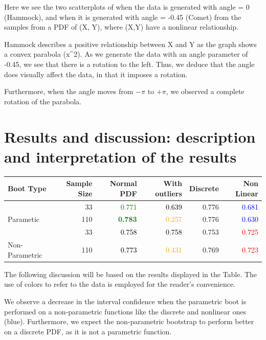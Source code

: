 \documentclass[11pt,]{article}
\begin{document}
Here we see the two scatterplots of when the data is generated with
angle = 0 (Hammock), and when it is generated with angle = -0.45 (Comet)
from the samples from a PDF of (X, Y), where (X,Y) have a nonlinear
relationship.

Hammock describes a positive relationship between X and Y as the graph
shows a convex parabola (x\^{}2). As we generate the data with an angle
parameter of -0.45, we see that there is a rotation to the left. Thus,
we deduce that the angle does visually affect the data, in that it
imposes a rotation.

Furthermore, when the angle moves from \(-\pi\) to \(+\pi\), we observed
a complete rotation of the parabola.

\hypertarget{results-and-discussion-description-and-interpretation-of-the-results}{%
\section{Results and discussion: description and interpretation of the
results}\label{results-and-discussion-description-and-interpretation-of-the-results}}

\begin{table}
\centering
\begin{tabular}{l|r|>{}r|>{}r|r|>{}r}
\hline
Boot Type & Sample Size & Normal PDF & With outliers & Discrete & Non Linear\\
\hline
 & 33 & \textcolor{green}{0.771} & \textcolor{black}{0.639} & 0.776 & \textcolor{blue}{0.681}\\
\cline{2-6}
\multirow[t]{-2}{*}{\raggedright\arraybackslash Parametic} & 110 & \textcolor{green}{\textbf{0.783}} & \textcolor{orange}{0.257} & 0.776 & \textcolor{blue}{0.630}\\
\cline{1-6}
 & 33 & \textcolor{black}{0.758} & \textcolor{black}{0.758} & 0.753 & \textcolor{red}{0.725}\\
\cline{2-6}
\multirow[t]{-2}{*}{\raggedright\arraybackslash Non-Parametric} & 110 & \textcolor{black}{0.773} & \textcolor{orange}{0.431} & 0.769 & \textcolor{red}{0.723}\\
\hline
\end{tabular}
\end{table}

The following discussion will be based on the results displayed in the
Table. The use of colors to refer to the data is employed for the
reader's convenience.

We observe a decrease in the interval confidence when the parametric
boot is performed on a non-parametric functions like the discrete and
nonlinear ones (blue). Furthermore, we expect the non-parametric
bootstrap to perform better on a discrete PDF, as it is not a parametric
function.
\end{document}
